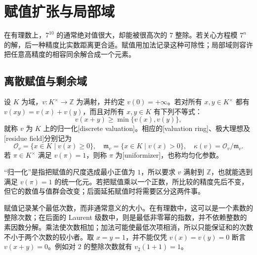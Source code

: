 
\section{赋值扩张与局部域}
\label{b1:sec:D01}

在有理数上，\(7^{10}\) 的通常绝对值很大，却能被很高次的 \(7\) 整除。若关心方程模 \(7^n\) 的解，后一种精度比实数距离更合适。赋值用加法记录这种可除性；局部域则容许把任意高精度的相容同余解合成一个元素。

\subsection{离散赋值与剩余域}
\label{b1:subsec:D01:01}

\begin{definition}\label{b1:def:discrete-valuation}
	设 \(K\) 为域，\(v:K^\times\rightarrow\mathbb Z\) 为满射，并约定 \(v(0)=+\infty\)。若对所有 \(x,y\in K^\times\) 都有 \(v(xy)=v(x)+v(y)\)，而且对所有 \(x,y\in K\) 有下列不等式：
	\[
		v(x+y)\geq\min\{v(x),v(y)\},
	\]
	就称 \(v\) 为 \(K\) 上的归一化[discrete valuation]。相应的[valuation ring]、极大理想及[residue field]分别记为
	\[
		\mathcal O_v=\{x\in K\mid v(x)\geq0\},\quad \mathfrak m_v=\{x\in K\mid v(x)>0\},\quad \kappa(v)=\mathcal O_v/\mathfrak m_v.
	\]
	若 \(\pi\in K^\times\) 满足 \(v(\pi)=1\)，则称 \(\pi\) 为[uniformizer]，也称均匀化参数。
\end{definition}


“归一化”是指把赋值的尺度选成最小正值为 \(1\)，所以要求 \(v\) 满射到 \(\mathbb Z\)，也就能选到满足 \(v(\pi)=1\) 的统一化元。若把赋值乘以一个正数，所比较的精度先后不变，但它的数值与值群会改变；后面延拓赋值时将需要区分这两件事。

\ProseParagraphBreak
赋值记录某个最低次数，而非通常意义的大小。在有理数中，这可以是一个素数的整除次数；在后面的 Laurent 级数中，则是最低非零幂的指数，并不依赖整数的素因数分解。乘法使次数相加；加法可能使最低次项相消，所以只能保证和的次数不小于两个次数的较小者。取 \(x=y=1\)，并不能仅凭 \(v(x)=v(y)=0\) 断言 \(v(x+y)=0\)。例如对 \(2\) 的整除次数就有 \(v_2(1+1)=1\)。

